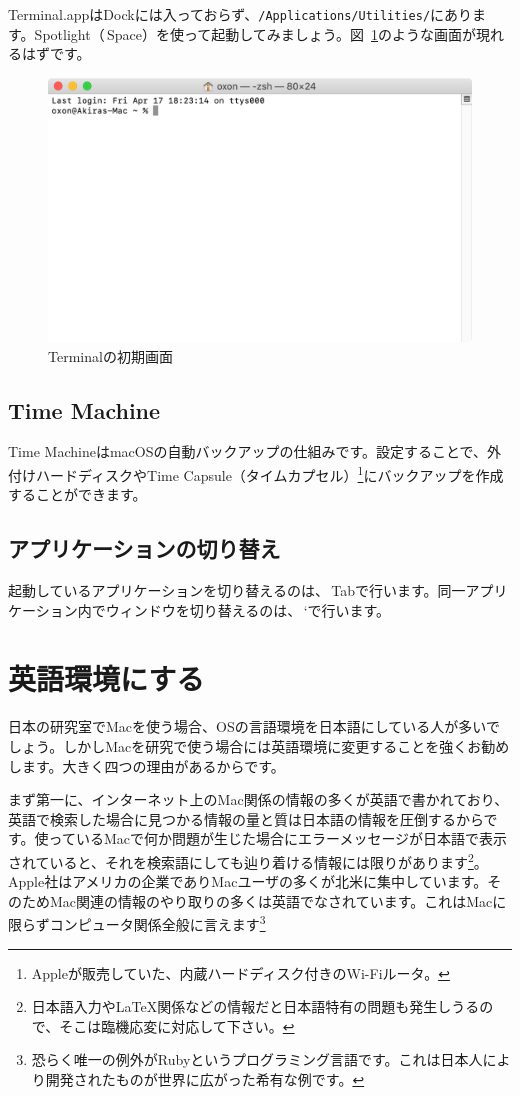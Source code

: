 Terminal.appはDockには入っておらず、\texttt{/Applications/Utilities/}にあります。Spotlight（\cmdkey\,Space）を使って起動してみましょう。図~\ref{fig:Terminal}のような画面が現れるはずです。
\begin{figure}
  \centering
  \includegraphics[scale=0.35]{fig/Terminal.png}
  \caption{Terminalの初期画面}
  \label{fig:Terminal}
\end{figure}

\subsection{Time Machine}
Time MachineはmacOSの自動バックアップの仕組みです。設定することで、外付けハードディスクやTime Capsule（タイムカプセル）\footnote{Appleが販売していた、内蔵ハードディスク付きのWi-Fiルータ。}にバックアップを作成することができます。

\subsection{アプリケーションの切り替え}
起動しているアプリケーションを切り替えるのは、\cmdkey\,Tabで行います。同一アプリケーション内でウィンドウを切り替えるのは、\cmdkey\,`で行います。

\section{英語環境にする}
日本の研究室でMacを使う場合、OSの言語環境を日本語にしている人が多いでしょう。しかしMacを研究で使う場合には英語環境に変更することを強くお勧めします。大きく四つの理由があるからです。

まず第一に、インターネット上のMac関係の情報の多くが英語で書かれており、英語で検索した場合に見つかる情報の量と質は日本語の情報を圧倒するからです。使っているMacで何か問題が生じた場合にエラーメッセージが日本語で表示されていると、それを検索語にしても辿り着ける情報には限りがあります\footnote{日本語入力や\LaTeX 関係などの情報だと日本語特有の問題も発生しうるので、そこは臨機応変に対応して下さい。}。Apple社はアメリカの企業でありMacユーザの多くが北米に集中しています。そのためMac関連の情報のやり取りの多くは英語でなされています。これはMacに限らずコンピュータ関係全般に言えます\footnote{恐らく唯一の例外がRubyというプログラミング言語です。これは日本人により開発されたものが世界に広がった希有な例です。}

